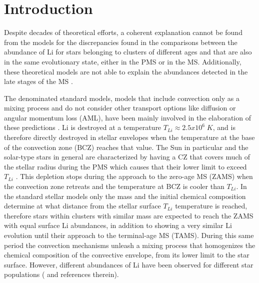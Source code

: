 \documentclass[fleqn,usenatbib]{mnras}
\begin{document}

\section{Introduction}
Despite decades of theoretical efforts, a coherent explanation cannot be found from the models for the discrepancies found in the comparisons between the abundance of Li for stars belonging to clusters of different ages and that are also in the same evolutionary state, either in the PMS or in the MS. Additionally, these theoretical models are not able to explain the abundances detected in the late stages of the MS \citep{Tschape2001}.\par

The denominated standard models, models that include convection only as a mixing process and do not consider other transport options like diffusion or angular momentum loss (AML), have been mainly involved in the elaboration of these predictions \citep{Sestito2005}. Li is destroyed at a temperature $T_{Li} \approx 2.5 x 10^6\; K$, and is therefore directly destroyed in stellar envelopes when the temperature at the base of the convection zone (BCZ) reaches that value. The Sun in particular and the solar-type stars in general are characterized by having a CZ that covers much of the stellar radius during the PMS which causes that their lower limit to exceed $T_{Li}$ \citep{Iben1965}. This depletion stops during the approach to the zero-age MS (ZAMS) when the convection zone retreats and the temperature at BCZ is cooler than $T_{Li}$. In the standard stellar models only the mass and the initial chemical composition determine at what distance from the stellar surface $T_{Li}$ temperature is reached, therefore stars within clusters with similar mass are expected to reach the ZAMS with equal surface Li abundances, in addition to showing a very similar Li evolution until their approach to the terminal-age MS (TAMS). During this same period the convection mechanisms unleash a mixing process that homogenizes the chemical composition of the convective envelope, from its lower limit to the star surface. However, different abundances of Li have been observed for different star populations (\citet{Somers2014} and references therein).\par
\end{document}
